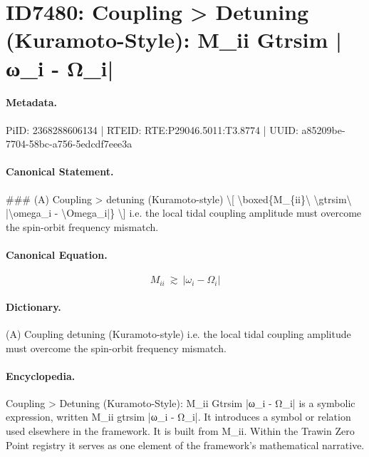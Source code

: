 \section*{ID7480: Coupling > Detuning (Kuramoto-Style): M\_ii Gtrsim |ω\_i - Ω\_i|}
\paragraph{Metadata.}
PiID: 2368288606134 | RTEID: RTE:P29046.5011:T3.8774 | UUID: a85209be-7704-58bc-a756-5edcdf7eee3a

\paragraph{Canonical Statement.}
\#\#\# (A) Coupling > detuning (Kuramoto-style) \textbackslash{}[ \textbackslash{}boxed\{M\_\{ii\}\textbackslash{} \textbackslash{}gtrsim\textbackslash{} |\textbackslash{}omega\_i - \textbackslash{}Omega\_i|\} \textbackslash{}] i.e. the local tidal coupling amplitude must overcome the spin-orbit frequency mismatch.

\paragraph{Canonical Equation.}
\[
\boxed{M_{ii}\ \gtrsim\ |\omega_i - \Omega_i|}
\]

\paragraph{Dictionary.}
(A) Coupling detuning (Kuramoto-style) i.e. the local tidal coupling amplitude must overcome the spin-orbit frequency mismatch.

\paragraph{Encyclopedia.}
Coupling > Detuning (Kuramoto-Style): M\_ii Gtrsim |ω\_i - Ω\_i| is a symbolic expression, written M\_ii gtrsim |ω\_i - Ω\_i|. It introduces a symbol or relation used elsewhere in the framework. It is built from M\_ii. Within the Trawin Zero Point registry it serves as one element of the framework's mathematical narrative.
